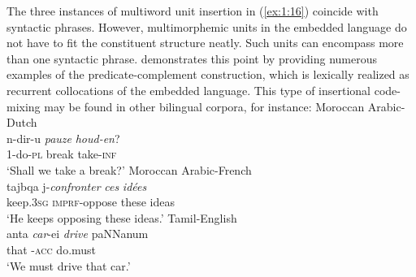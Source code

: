 The three instances of multiword unit insertion in (\ref{ex:1:16}) coincide with syntactic phrases. However, multimorphemic units in the embedded language do not have to fit the constituent structure neatly. Such units can encompass more than one syntactic phrase. \citet{backus-units-2003} demonstrates this point by providing numerous examples of the predicate-complement construction, which is lexically realized as recurrent collocations of the embedded language. This type of insertional code-mixing may be found in other bilingual corpora, for instance:
\ea \label{ex:1:17}
Moroccan Arabic-Dutch \citep[245]{boumans-syntax-1998}\\
\gll n-dir-u \textit{pauze} \textit{houd-en}?\\
1-do-\textsc{pl} break take-\textsc{inf}\\
\glt `Shall we take a break?'
\ex \label{ex:1:18}
Moroccan Arabic-French \citep[315]{bentahila-davies-1983}\\
\gll tajbqa j-\textit{confronter} \textit{ces} \textit{idées}\\
keep.\textsc{3sg} \textsc{imprf}-oppose these ideas\\
\glt `He keeps opposing these ideas.'
\ex \label{ex:1:19}
Tamil-English \citep[80]{sankoff-et-al-1990}\\
\gll anta  \textit{car}-ei \textit{drive} paNNanum\\
that { \hspace{4mm}-\textsc{acc}} {} do.must\\
\glt `We must drive that car.'
\z

